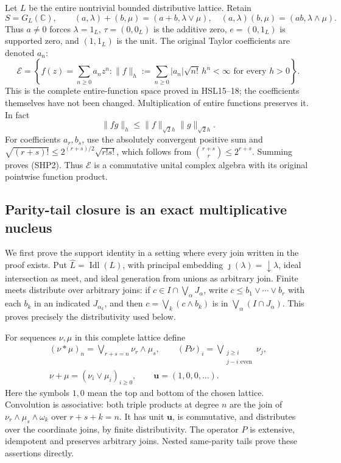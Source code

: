 Let $L$ be the entire nontrivial bounded distributive lattice.
Retain
\[
 S=G_L(\mathbb C),\qquad
 (a,\lambda)+(b,\mu)=(a+b,\lambda\vee\mu),\quad
 (a,\lambda)(b,\mu)=(ab,\lambda\wedge\mu).
\]
Thus $a\ne0$ forces $\lambda=1_L$,
$\tau=(0,0_L)$ is the additive zero,
$e=(0,1_L)$ is supported zero, and $(1,1_L)$ is the unit.
The original Taylor coefficients are denoted $a_n$:
\begin{equation}\tag{SHP1}
 \mathcal E=\left\{f(z)=\sum_{n\ge0}a_nz^n:
       \|f\|_h:=\sum_{n\ge0}|a_n|\sqrt{n!}\,h^n<\infty
                                  \text{ for every }h>0\right\}.
\end{equation}
This is the complete entire-function space proved in HSL15--18;
the coefficients themselves have not been changed.
Multiplication of entire functions preserves it. In fact
\begin{equation}\tag{SHP2}
 \|fg\|_h\le\|f\|_{\sqrt2h}\|g\|_{\sqrt2h}.
\end{equation}
For coefficients $a_r,b_s$, use the absolutely convergent
positive sum and
$\sqrt{(r+s)!}\le2^{(r+s)/2}\sqrt{r!s!}$, which follows from
$\binom{r+s}r\le2^{r+s}$. Summing proves (SHP2).
Thus $\mathcal E$ is a commutative unital complex algebra with
its original pointwise function product.

\subsection{Parity-tail closure is an exact multiplicative nucleus}

We first prove the support identity in a setting where every
join written in the proof exists. Put
$\widehat L=\operatorname{Idl}(L)$, with principal embedding
$\jmath(\lambda)=\downarrow\lambda$, ideal intersection as
meet, and ideal generation from unions as arbitrary join.
Finite meets distribute over arbitrary joins: if
$c\in I\cap\bigvee_\alpha J_\alpha$, write
$c\le b_1\vee\cdots\vee b_r$ with each $b_k$ in an indicated
$J_{\alpha_k}$, and then
$c=\bigvee_k(c\wedge b_k)$ is in
$\bigvee_\alpha(I\cap J_\alpha)$.
This proves precisely the distributivity used below.

For sequences $\nu,\mu$ in this complete lattice define
\begin{equation}\tag{SHP3}
 \begin{gathered}
 (\nu*\mu)_n=\bigvee_{r+s=n}\nu_r\wedge\mu_s,\qquad
 (P\nu)_i=\bigvee_{\substack{j\ge i\\j-i\text{ even}}}\nu_j,\\
 \nu+\mu=(\nu_i\vee\mu_i)_{i\ge0},\qquad
 \mathbf u=(1,0,0,\ldots).
 \end{gathered}
\end{equation}
Here the symbols $1,0$ mean the top and bottom of the chosen
lattice. Convolution is associative: both triple products at
degree $n$ are the join of $\nu_r\wedge\mu_s\wedge\omega_k$
over $r+s+k=n$. It has unit $\mathbf u$, is commutative,
and distributes over the coordinate joins, by finite
distributivity. The operator $P$ is extensive, idempotent
and preserves arbitrary joins. Nested same-parity tails prove
these assertions directly.

